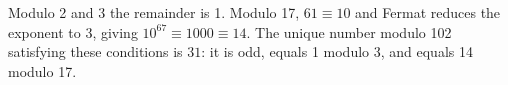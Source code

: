 Modulo 2 and 3 the remainder is 1. Modulo 17, $61\equiv10$ and Fermat reduces the exponent to 3, giving $10^{67}\equiv1000\equiv14$. The unique number modulo 102 satisfying these conditions is $\boxed{31}$: it is odd, equals 1 modulo 3, and equals 14 modulo 17.
